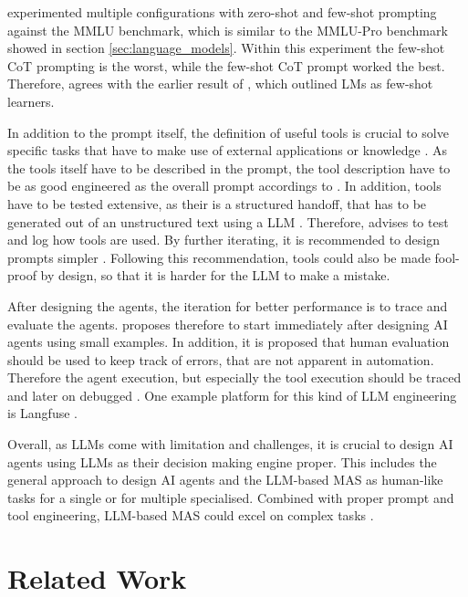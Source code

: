 \documentclass[a4paper,oneside,bibliography=totoc]{scrbook}
\begin{document}
\citet{Schulhoff2025} experimented multiple configurations with zero-shot and few-shot prompting against the MMLU benchmark, which is similar to the MMLU-Pro benchmark showed in section \ref{sec:language_models}. Within this experiment the few-shot \ac{CoT} prompting is the worst, while the few-shot \ac{CoT} prompt worked the best. Therefore, \citet{Schulhoff2025} agrees with the earlier result of \citet{Brown2020}, which outlined \acp{LM} as few-shot learners.

In addition to the prompt itself, the definition of useful tools is crucial to solve specific tasks that have to make use of external applications or knowledge \cite{OpenAI2025}. As the tools itself have to be described in the prompt, the tool description have to be as good engineered as the overall prompt accordings to \citet{Anthropic2024}. In addition, tools have to be tested extensive, as their is a structured handoff, that has to be generated out of an unstructured text using a \ac{LLM} \cite{Anthropic2024}. Therefore, \citet{Anthropic2024} advises to test and log how tools are used. By further iterating, it is recommended to design prompts simpler \cite{Anthropic2024}. Following this recommendation, tools could also be made fool-proof by design, so that it is harder for the \ac{LLM} to make a mistake.

After designing the agents, the iteration for better performance is to trace and evaluate the agents. \citet{Hadfield2025} proposes therefore to start immediately after designing \ac{AI} agents using small examples. In addition, it is proposed that human evaluation should be used to keep track of errors, that are not apparent in automation. Therefore the agent execution, but especially the tool execution should be traced and later on debugged \cite{Hadfield2025}. One example platform for this kind of \ac{LLM} engineering is Langfuse \cite{Inc.2025}.

Overall, as \acp{LLM} come with limitation and challenges, it is crucial to design \ac{AI} agents using \acp{LLM} as their decision making engine proper. This includes the general approach to design \ac{AI} agents and the \ac{LLM}-based \ac{MAS} as human-like tasks for a single or for multiple specialised. Combined with proper prompt and tool engineering, \ac{LLM}-based \ac{MAS} could excel on complex tasks \cite{Hadfield2025}.

\chapter{Related Work}
\label{ch:related_work_chapter}
\end{document}
